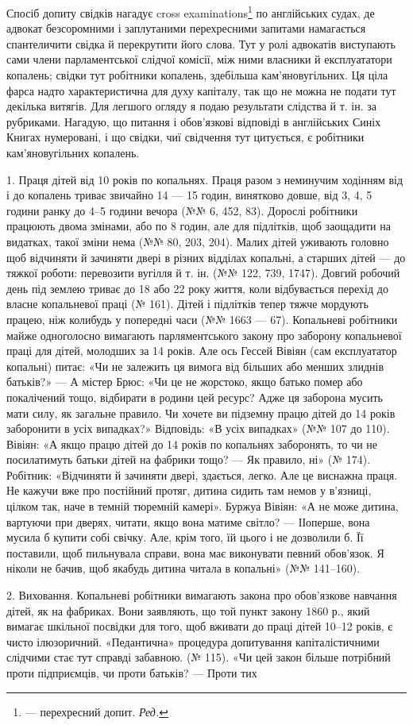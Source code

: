 Спосіб допиту свідків нагадує cross examinations\footnote*{
— перехресний допит. \emph{Ред.}
} по англійських
судах, де адвокат безсоромними і заплутаними перехресними
запитами намагається спантеличити свідка й перекрутити
його слова. Тут у ролі адвокатів виступають сами члени парламентської
слідчої комісії, між ними власники й експлуататори копалень;
свідки тут робітники копалень, здебільша кам’яновугільних.
Ця ціла фарса надто характеристична для духу капіталу, так що
не можна не подати тут декілька витягів. Для легшого огляду
я подаю результати слідства й т. ін. за рубриками. Нагадую, що
питання і обов’язкові відповіді в англійських Синіх Книгах
нумеровані, і що свідки, чиї свідчення тут цитується, є робітники
кам’яновугільних копалень.

1. Праця дітей від 10 років по копальнях. Праця разом з
неминучим ходінням від і до копалень триває звичайно 14 —
15 годин, винятково довше, від 3, 4, 5 години ранку до 4--5 години
вечора (№№ 6, 452, 83). Дорослі робітники працюють двома
змінами, або по 8 годин, але для підлітків, щоб заощадити на
видатках, такої зміни нема (№№ 80, 203, 204). Малих дітей уживають
головно щоб відчиняти й зачиняти двері в різних відділах
копальні, а старших дітей — до тяжкої роботи: перевозити вугілля
й т. ін. (№№ 122, 739, 1747). Довгий робочий день під землею
триває до 18 або 22 року життя, коли відбувається перехід до
власне копальневої праці (№ 161). Дітей і підлітків тепер тяжче
мордують працею, ніж колибудь у попередні часи (№№ 1663 —
67). Копальневі робітники майже одноголосно вимагають парляментського
закону про заборону копальневої праці для дітей,
молодших за 14 років. Але ось Гессей Вівіян (сам експлуататор
копальні) питає: «Чи не залежить ця вимога від більших або
менших злиднів батьків?» — А містер Брюс: «Чи це не жорстоко,
якщо батько помер або покалічений тощо, відбирати в родини
цей ресурс? Адже ця заборона мусить мати силу, як загальне
правило. Чи хочете ви підземну працю дітей до 14 років заборонити
в усіх випадках?» Відповідь: «В усіх випадках» (№№ 107
до 110). Вівіян: «А якщо працю дітей до 14 років по копальнях
заборонять, то чи не посилатимуть батьки дітей на фабрики
тощо? — Як правило, ні» (№ 174). Робітник: «Відчиняти й зачиняти
двері, здається, легко. Але це виснажна праця. Не кажучи
вже про постійний протяг, дитина сидить там немов у в’язниці,
цілком так, наче в темній тюремній камері». Буржуа Вівіян:
«А не може дитина, вартуючи при дверях, читати, якщо вона
матиме світло? — ІІоперше, вона мусила б купити собі свічку.
Але, крім того, їй цього і не дозволили б. Її поставили, щоб пильнувала
справи, вона має виконувати певний обов’язок. Я ніколи
не бачив, щоб якабудь дитина читала в копальні» (№№ 141--160).

2. Виховання. Копальневі робітники вимагають закона про
обов’язкове навчання дітей, як на фабриках. Вони заявляють,
що той пункт закону 1860 р., який вимагає шкільної посвідки для
того, щоб вживати до праці дітей 10--12 років, є чисто ілюзоричний.
«Педантична» процедура допитування капіталістичними
слідчими стає тут справді забавною. (№ 115). «Чи цей закон більше
потрібний проти підприємців, чи проти батьків? — Проти тих
\parbreak{}  %
